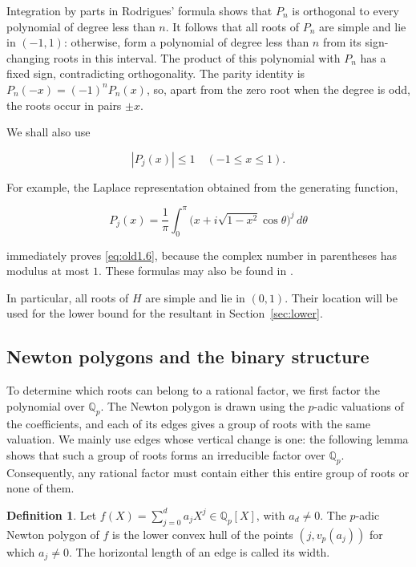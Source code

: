 \documentclass[11pt,a4paper]{article}
\numberwithin{equation}{section}
\theoremstyle{definition}
\newtheorem{definition}[theorem]{Definition}
\begin{document}
Integration by parts in Rodrigues' formula shows that \(P_n\) is orthogonal to every polynomial of degree less than \(n\). It follows that all roots of \(P_n\) are simple and lie in \((-1,1)\): otherwise, form a polynomial of degree less than \(n\) from its sign-changing roots in this interval. The product of this polynomial with \(P_n\) has a fixed sign, contradicting orthogonality. The parity identity is \(P_n(-x)=(-1)^nP_n(x)\), so, apart from the zero root when the degree is odd, the roots occur in pairs \(\pm x\).

We shall also use

\begin{equation}
|P_j(x)|\le1\quad(-1\le x\le1).
\label{eq:old1.6}
\end{equation}

For example, the Laplace representation obtained from the generating function,

\[
P_j(x)=\frac1\pi\int_0^\pi
\bigl(x+i\sqrt{1-x^2}\cos\theta\bigr)^j\,d\theta
\]

immediately proves \eqref{eq:old1.6}, because the complex number in parentheses has modulus at most $1$. These formulas may also be found in \cite{dlmf}.

In particular, all roots of \(H\) are simple and lie in \((0,1)\). Their location will be used for the lower bound for the resultant in Section~\ref{sec:lower}.

\subsection{Newton polygons and the binary structure}

To determine which roots can belong to a rational factor, we first factor the polynomial over \(\mathbb Q_p\). The Newton polygon is drawn using the \(p\)-adic valuations of the coefficients, and each of its edges gives a group of roots with the same valuation. We mainly use edges whose vertical change is one: the following lemma shows that such a group of roots forms an irreducible factor over \(\mathbb Q_p\). Consequently, any rational factor must contain either this entire group of roots or none of them.

\begin{definition}\label{def:np}
Let \(f(X)=\sum_{j=0}^d a_jX^j\in\mathbb Q_p[X]\), with \(a_d\ne0\). The \(p\)-adic Newton polygon of \(f\) is the lower convex hull of the points \((j,v_p(a_j))\) for which \(a_j\ne0\). The horizontal length of an edge is called its width.
\end{definition}
\end{document}
